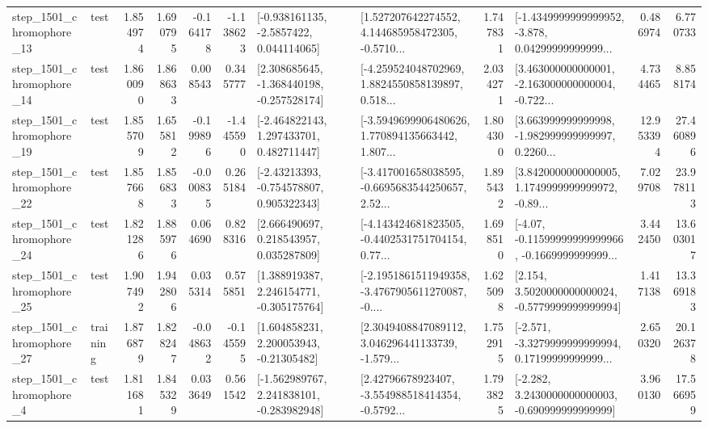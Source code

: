 \begin{tabular}{llrrrrllrlrr}
 step\_1501\_chromophore\_13 &      test &      1.854974 &    1.690795 &     -0.164178 & -1.138623 &     [-0.938161135, -2.5857422, 0.044114065] &  [1.527207642274552, 4.144685958472305, -0.5710... &       1.747831 &  [-1.4349999999999952, -3.878, 0.04299999999999... &            0.486974 &          6.770733 \\
 step\_1501\_chromophore\_14 &      test &      1.860090 &    1.868633 &      0.008543 &  0.345777 &   [2.308685645, -1.368440198, -0.257528174] &  [-4.259524048702969, 1.8824550858139897, 0.518... &       2.034271 &  [3.463000000000001, -2.163000000000004, -0.722... &            4.734465 &          8.858174 \\
 step\_1501\_chromophore\_19 &      test &      1.855709 &    1.655812 &     -0.199896 & -1.445590 &    [-2.464822143, 1.297433701, 0.482711447] &  [-3.5949699906480626, 1.770894135663442, 1.807... &       1.804300 &  [3.663999999999998, -1.982999999999997, 0.2260... &           12.953394 &         27.460896 \\
 step\_1501\_chromophore\_22 &      test &      1.857668 &    1.856833 &     -0.000835 &  0.265184 &    [-2.43213393, -0.754578807, 0.905322343] &  [-3.417001658038595, -0.6695683544250657, 2.52... &       1.895432 &  [3.8420000000000005, 1.1749999999999972, -0.89... &            7.029708 &         23.978113 \\
 step\_1501\_chromophore\_24 &      test &      1.821286 &    1.885976 &      0.064690 &  0.828316 &     [2.666490697, 0.218543957, 0.035287809] &  [-4.143424681823505, -0.4402531751704154, 0.77... &       1.698510 &  [-4.07, -0.11599999999999966, -0.1669999999999... &            3.442450 &         13.603017 \\
 step\_1501\_chromophore\_25 &      test &      1.907492 &    1.942806 &      0.035314 &  0.575851 &    [1.388919387, 2.246154771, -0.305175764] &  [-2.1951861511949358, -3.4767905611270087, -0.... &       1.625098 &   [2.154, 3.5020000000000024, -0.5779999999999994] &            1.417138 &         13.369183 \\
 step\_1501\_chromophore\_27 &  training &      1.876879 &    1.828247 &     -0.048632 & -0.145595 &     [1.604858231, 2.200053943, -0.21305482] &  [2.3049408847089112, 3.046296441133739, -1.579... &       1.752915 &  [-2.571, -3.3279999999999994, 0.17199999999999... &            2.650320 &         20.126378 \\
  step\_1501\_chromophore\_4 &      test &      1.811681 &    1.845329 &      0.033649 &  0.561542 &   [-1.562989767, 2.241838101, -0.283982948] &  [2.42796678923407, -3.554988518414354, -0.5792... &       1.793825 &   [-2.282, 3.2430000000000003, -0.690999999999999] &            3.960130 &         17.566959 \\

\end{tabular}
